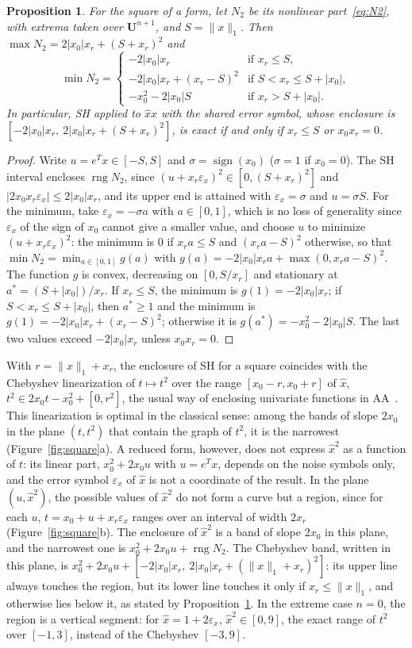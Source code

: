 \documentclass[10pt]{article}
\newtheorem{propo}{Proposition}
\theoremstyle{definition}
\newcommand{\U}{\mathbf{U}}
\newcommand{\eps}{\varepsilon}
\newcommand{\ex}{\eps_x}
\newcommand{\rng}{\operatorname{rng}}
\begin{document}
\begin{propo}
\label{prop:square}
For the square of a form, let $N_2$ be its nonlinear part~\eqref{eq:N2}, with extrema taken over $\U^{n+1}$, and $S=\|x\|_1$. Then $\max N_2=2|x_0|x_r+(S+x_r)^2$ and
\[
\min N_2=\begin{cases}-2|x_0|x_r & \text{if } x_r\le S,\\ -2|x_0|x_r+(x_r-S)^2 & \text{if } S<x_r\le S+|x_0|,\\ -x_0^2-2|x_0|S & \text{if } x_r>S+|x_0|.\end{cases}
\]
In particular, SH applied to $\hat x\hat x$ with the shared error symbol, whose enclosure is $[-2|x_0|x_r,\ 2|x_0|x_r+(S+x_r)^2]$, is exact if and only if $x_r\le S$ or $x_0x_r=0$.
\end{propo}
\begin{proof}
Write $u=e^Tx\in[-S,S]$ and $\sigma=\operatorname{sign}(x_0)$ ($\sigma=1$ if $x_0=0$). The SH interval encloses $\rng N_2$, since $(u+x_r\ex)^2\in[0,(S+x_r)^2]$ and $|2x_0x_r\ex|\le2|x_0|x_r$, and its upper end is attained with $\ex=\sigma$ and $u=\sigma S$. For the minimum, take $\ex=-\sigma a$ with $a\in[0,1]$, which is no loss of generality since $\ex$ of the sign of $x_0$ cannot give a smaller value, and choose $u$ to minimize $(u+x_r\ex)^2$: the minimum is $0$ if $x_ra\le S$ and $(x_ra-S)^2$ otherwise, so that $\min N_2=\min_{a\in[0,1]}g(a)$ with $g(a)=-2|x_0|x_ra+\max(0,x_ra-S)^2$. The function $g$ is convex, decreasing on $[0,S/x_r]$ and stationary at $a^*=(S+|x_0|)/x_r$. If $x_r\le S$, the minimum is $g(1)=-2|x_0|x_r$; if $S<x_r\le S+|x_0|$, then $a^*\ge1$ and the minimum is $g(1)=-2|x_0|x_r+(x_r-S)^2$; otherwise it is $g(a^*)=-x_0^2-2|x_0|S$. The last two values exceed $-2|x_0|x_r$ unless $x_0x_r=0$.
\end{proof}
With $r=\|x\|_1+x_r$, the enclosure of SH for a square coincides with the Chebyshev linearization of $t\mapsto t^2$ over the range $[x_0-r,x_0+r]$ of $\hat x$, $t^2\in 2x_0t-x_0^2+[0,r^2]$, the usual way of enclosing univariate functions in AA~\cite{stolfi1997self}. This linearization is optimal in the classical sense: among the bands of slope $2x_0$ in the plane $(t,t^2)$ that contain the graph of $t^2$, it is the narrowest (Figure~\ref{fig:square}a). A reduced form, however, does not express $\hat x^2$ as a function of $t$: its linear part, $x_0^2+2x_0u$ with $u=e^Tx$, depends on the noise symbols only, and the error symbol $\ex$ of $\hat x$ is not a coordinate of the result. In the plane $(u,\hat x^2)$, the possible values of $\hat x^2$ do not form a curve but a region, since for each $u$, $t=x_0+u+x_r\ex$ ranges over an interval of width $2x_r$ (Figure~\ref{fig:square}b). The enclosure of $\hat x^2$ is a band of slope $2x_0$ in this plane, and the narrowest one is $x_0^2+2x_0u+\rng N_2$. The Chebyshev band, written in this plane, is $x_0^2+2x_0u+[-2|x_0|x_r,\ 2|x_0|x_r+(\|x\|_1+x_r)^2]$: its upper line always touches the region, but its lower line touches it only if $x_r\le\|x\|_1$, and otherwise lies below it, as stated by Proposition~\ref{prop:square}. In the extreme case $n=0$, the region is a vertical segment: for $\hat x=1+2\ex$, $\hat x^2\in[0,9]$, the exact range of $t^2$ over $[-1,3]$, instead of the Chebyshev $[-3,9]$.
\end{document}
